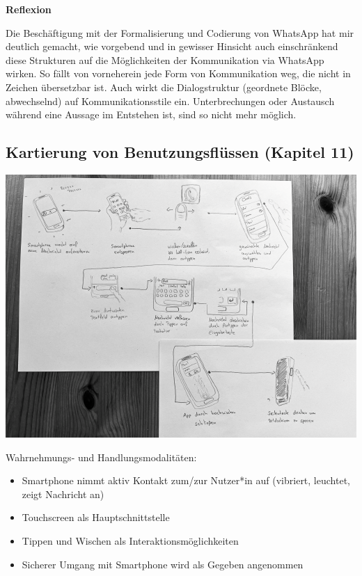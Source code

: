 \documentclass[
  a4paper,
]{book}
\providecommand{\tightlist}{%
  \setlength{\itemsep}{0pt}\setlength{\parskip}{0pt}}
\begin{document}
\textbf{Reflexion}

Die Beschäftigung mit der Formalisierung und Codierung von WhatsApp hat mir deutlich gemacht, wie vorgebend und in gewisser Hinsicht auch einschränkend diese Strukturen auf die Möglichkeiten der Kommunikation via WhatsApp wirken. So fällt von vorneherein jede Form von Kommunikation weg, die nicht in Zeichen übersetzbar ist. Auch wirkt die Dialogstruktur (geordnete Blöcke, abwechselnd) auf Kommunikationsstile ein. Unterbrechungen oder Austausch während eine Aussage im Entstehen ist, sind so nicht mehr möglich.

\subsection*{Kartierung von Benutzungsflüssen (Kapitel 11)}\label{kartierung-von-benutzungsfluxfcssen-kapitel-11-1}

\begin{center}\includegraphics{Figures/11-Bsp.2} \end{center}

Wahrnehmungs- und Handlungsmodalitäten:

\begin{itemize}
\tightlist
\item
  Smartphone nimmt aktiv Kontakt zum/zur Nutzer*in auf (vibriert, leuchtet, zeigt Nachricht an)
\item
  Touchscreen als Hauptschnittstelle
\item
  Tippen und Wischen als Interaktionsmöglichkeiten
\item
  Sicherer Umgang mit Smartphone wird als Gegeben angenommen
\end{itemize}
\end{document}
